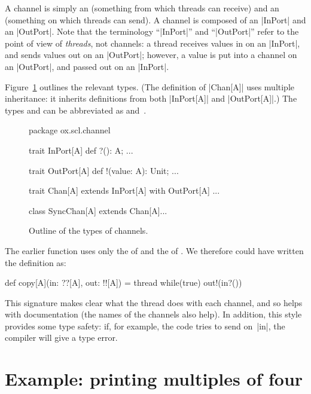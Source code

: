 
A channel is simply an  (something from which threads can
receive) and an  (something on which threads can send).  A
channel is composed of an |InPort| and an |OutPort|.
Note that the terminology ``|InPort|'' and ``|OutPort|'' refer to the point of
view of \emph{threads}, not channels: a thread receives values in on an
|InPort|, and sends values out on an |OutPort|; however, a value is put into a
channel on an |OutPort|, and passed out on an |InPort|.

Figure~\ref{fig:channel-types} outlines the relevant types.  (The definition
of |Chan[A]| uses multiple inheritance: it inherits definitions from both
|InPort[A]| and |OutPort[A]|.)  The types  and
 can be abbreviated as  and~\SCALA{!![A]}.


\begin{figure}
\begin{scala}
package ox.scl.channel

trait InPort[A]{ def ?(): A; ... }
        
trait OutPort[A]{ def !(value: A): Unit; ... }
  
trait Chan[A] extends InPort[A] with OutPort[A]{ ... }

class SyncChan[A] extends Chan[A]{...} 
\end{scala}
\caption{Outline of the types of channels.}
\label{fig:channel-types}
\end{figure}


The earlier function  uses only the  of 
and the  of .  We therefore could have written the
definition as:
%
\begin{scala}
def copy[A](in: ??[A], out: !![A]) = thread{ 
  while(true) out!(in?()) 
}
\end{scala}
%
This signature makes clear what the thread does with each channel, and so
helps with documentation (the names of the channels also help).  In addition,
this style provides some  type safety: if, for example, the code tries to send
on~|in|, the compiler will give a type error. 


\section{Example: printing multiples of four}

